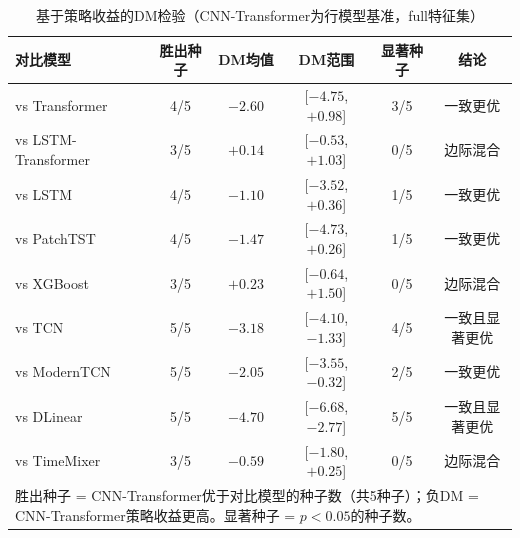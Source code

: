 \begin{table}[ht]
\centering
\caption{基于策略收益的DM检验（CNN-Transformer为行模型基准，full特征集）}
\label{tab:dm_econ}
\small
\begin{tabular}{lccccc}
\toprule
对比模型 & 胜出种子 & DM均值 & DM范围 & 显著种子 & 结论 \\
\midrule
vs Transformer & 4/5 & $-2.60$ & [$-4.75$, $+0.98$] & 3/5 & 一致更优 \\
vs LSTM-Transformer & 3/5 & $+0.14$ & [$-0.53$, $+1.03$] & 0/5 & 边际混合 \\
vs LSTM & 4/5 & $-1.10$ & [$-3.52$, $+0.36$] & 1/5 & 一致更优 \\
vs PatchTST & 4/5 & $-1.47$ & [$-4.73$, $+0.26$] & 1/5 & 一致更优 \\
vs XGBoost & 3/5 & $+0.23$ & [$-0.64$, $+1.50$] & 0/5 & 边际混合 \\
vs TCN & 5/5 & $-3.18$ & [$-4.10$, $-1.33$] & 4/5 & 一致且显著更优 \\
vs ModernTCN & 5/5 & $-2.05$ & [$-3.55$, $-0.32$] & 2/5 & 一致更优 \\
vs DLinear & 5/5 & $-4.70$ & [$-6.68$, $-2.77$] & 5/5 & 一致且显著更优 \\
vs TimeMixer & 3/5 & $-0.59$ & [$-1.80$, $+0.25$] & 0/5 & 边际混合 \\
\bottomrule
\multicolumn{6}{p{\textwidth}}{\small 胜出种子 = CNN-Transformer优于对比模型的种子数（共5种子）；负DM = CNN-Transformer策略收益更高。显著种子 = $p<0.05$的种子数。} \\
\end{tabular}
\end{table}
